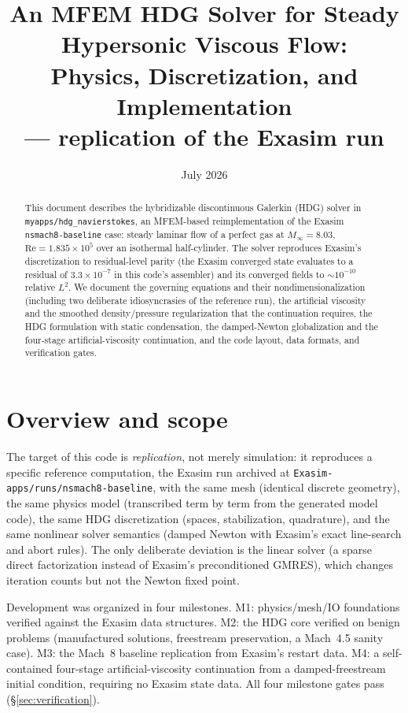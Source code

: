 \documentclass[11pt]{article}
\title{An MFEM HDG Solver for Steady Hypersonic Viscous Flow:\\
Physics, Discretization, and Implementation\\
{\large \code{myapps/hdg\_navierstokes} --- replication of the Exasim
\code{nsmach8-baseline} run}}
\author{}
\date{July 2026}
\newcommand{\Minf}{M_\infty}
\newcommand{\Rey}{\mathrm{Re}}
\newcommand{\code}[1]{\texttt{#1}}
\begin{document}
\maketitle

\begin{abstract}
This document describes the hybridizable discontinuous Galerkin (HDG) solver in
\code{myapps/hdg\_navierstokes}, an MFEM-based reimplementation of the Exasim
\code{nsmach8-baseline} case: steady laminar flow of a perfect gas at
$\Minf = 8.03$, $\Rey = 1.835\times 10^5$ over an isothermal half-cylinder.
The solver reproduces Exasim's discretization to residual-level parity
(the Exasim converged state evaluates to a residual of $3.3\times10^{-7}$ in
this code's assembler) and its converged fields to $\sim\!10^{-10}$ relative
$L^2$. We document the governing equations and their nondimensionalization
(including two deliberate idiosyncrasies of the reference run), the artificial
viscosity and the smoothed density/pressure regularization that the
continuation requires, the HDG formulation with static condensation, the
damped-Newton globalization and the four-stage artificial-viscosity
continuation, and the code layout, data formats, and verification gates.
\end{abstract}

\tableofcontents

\section{Overview and scope}

The target of this code is \emph{replication}, not merely simulation: it
reproduces a specific reference computation, the Exasim run archived at
\code{Exasim-apps/runs/nsmach8-baseline}, with the same mesh (identical
discrete geometry), the same physics model (transcribed term by term from the
generated model code), the same HDG discretization (spaces, stabilization,
quadrature), and the same nonlinear solver semantics (damped Newton with
Exasim's exact line-search and abort rules). The only deliberate deviation is
the linear solver (a sparse direct factorization instead of Exasim's
preconditioned GMRES), which changes iteration counts but not the Newton fixed
point.

Development was organized in four milestones. M1: physics/mesh/IO foundations
verified against the Exasim data structures. M2: the HDG core verified on
benign problems (manufactured solutions, freestream preservation, a Mach~4.5
sanity case). M3: the Mach~8 baseline replication from Exasim's restart data.
M4: a self-contained four-stage artificial-viscosity continuation from a
damped-freestream initial condition, requiring no Exasim state data. All four
milestone gates pass (\S\ref{sec:verification}).
\end{document}
